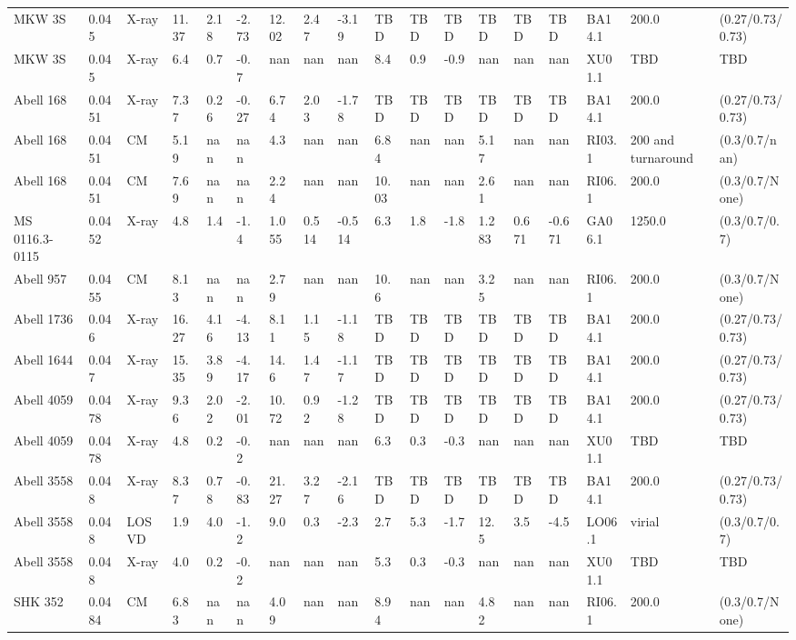 \documentclass{article}
\begin{document}
\begin{center}
\begin{landscape}
\begin{longtable}{llllllllllllllllll}
MKW 3S & 0.045 & X-ray & 11.37 & 2.18 & -2.73 & 12.02 & 2.47 & -3.19 & TBD & TBD & TBD & TBD & TBD & TBD & BA14.1 & 200.0 & (0.27/0.73/0.73) \\
MKW 3S & 0.045 & X-ray & 6.4 & 0.7 & -0.7 & nan & nan & nan & 8.4 & 0.9 & -0.9 & nan & nan & nan & XU01.1 & TBD & TBD \\
Abell 168 & 0.0451 & X-ray & 7.37 & 0.26 & -0.27 & 6.74 & 2.03 & -1.78 & TBD & TBD & TBD & TBD & TBD & TBD & BA14.1 & 200.0 & (0.27/0.73/0.73) \\
Abell 168 & 0.0451 & CM & 5.19 & nan & nan & 4.3 & nan & nan & 6.84 & nan & nan & 5.17 & nan & nan & RI03.1 & 200 and turnaround & (0.3/0.7/nan) \\
Abell 168 & 0.0451 & CM & 7.69 & nan & nan & 2.24 & nan & nan & 10.03 & nan & nan & 2.61 & nan & nan & RI06.1 & 200.0 & (0.3/0.7/None) \\
MS 0116.3-0115 & 0.0452 & X-ray & 4.8 & 1.4 & -1.4 & 1.055 & 0.514 & -0.514 & 6.3 & 1.8 & -1.8 & 1.283 & 0.671 & -0.671 & GA06.1 & 1250.0 & (0.3/0.7/0.7) \\
Abell 957 & 0.0455 & CM & 8.13 & nan & nan & 2.79 & nan & nan & 10.6 & nan & nan & 3.25 & nan & nan & RI06.1 & 200.0 & (0.3/0.7/None) \\
Abell 1736 & 0.046 & X-ray & 16.27 & 4.16 & -4.13 & 8.11 & 1.15 & -1.18 & TBD & TBD & TBD & TBD & TBD & TBD & BA14.1 & 200.0 & (0.27/0.73/0.73) \\
Abell 1644 & 0.047 & X-ray & 15.35 & 3.89 & -4.17 & 14.6 & 1.47 & -1.17 & TBD & TBD & TBD & TBD & TBD & TBD & BA14.1 & 200.0 & (0.27/0.73/0.73) \\
Abell 4059 & 0.0478 & X-ray & 9.36 & 2.02 & -2.01 & 10.72 & 0.92 & -1.28 & TBD & TBD & TBD & TBD & TBD & TBD & BA14.1 & 200.0 & (0.27/0.73/0.73) \\
Abell 4059 & 0.0478 & X-ray & 4.8 & 0.2 & -0.2 & nan & nan & nan & 6.3 & 0.3 & -0.3 & nan & nan & nan & XU01.1 & TBD & TBD \\
Abell 3558 & 0.048 & X-ray & 8.37 & 0.78 & -0.83 & 21.27 & 3.27 & -2.16 & TBD & TBD & TBD & TBD & TBD & TBD & BA14.1 & 200.0 & (0.27/0.73/0.73) \\
Abell 3558 & 0.048 & LOSVD & 1.9 & 4.0 & -1.2 & 9.0 & 0.3 & -2.3 & 2.7 & 5.3 & -1.7 & 12.5 & 3.5 & -4.5 & LO06.1 & virial & (0.3/0.7/0.7) \\
Abell 3558 & 0.048 & X-ray & 4.0 & 0.2 & -0.2 & nan & nan & nan & 5.3 & 0.3 & -0.3 & nan & nan & nan & XU01.1 & TBD & TBD \\
SHK 352 & 0.0484 & CM & 6.83 & nan & nan & 4.09 & nan & nan & 8.94 & nan & nan & 4.82 & nan & nan & RI06.1 & 200.0 & (0.3/0.7/None) \\

\end{longtable}
\end{landscape}
\end{center}
\end{document}
